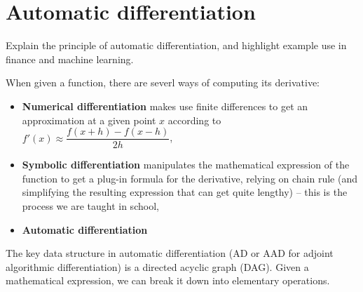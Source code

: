 \section{Automatic differentiation}

\begin{tcolorbox}[width=\linewidth, sharp corners=all, colback=white!95!black]
    Explain the principle of automatic differentiation, and highlight example use in finance and machine learning.
\end{tcolorbox}

When given a function, there are severl ways of computing its derivative:

\begin{itemize}
    \item \textbf{Numerical differentiation} makes use finite differences to get an approximation at a given point $x$ according to $f'(x) \approx \dfrac{f(x+h) - f(x-h)}{2h}$,
    \item \textbf{Symbolic differentiation} manipulates the mathematical expression of the function to get a plug-in formula for the derivative, relying on chain rule (and simplifying the resulting expression that can get quite lengthy) -- this is the process we are taught in school,
    \item \textbf{Automatic differentiation}
\end{itemize}

The key data structure in automatic differentiation (AD or AAD for adjoint algorithmic differentiation) is a directed acyclic graph (DAG). Given a mathematical expression, we can break it down into elementary operations.

